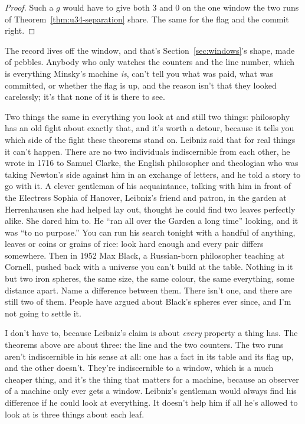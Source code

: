\documentclass[11pt,twoside]{article}
\theoremstyle{thielethm}
\theoremstyle{thieledef}
\theoremstyle{thieledef}
\theoremstyle{thieledef}
\theoremstyle{thielethm}
\theoremstyle{thieleobs}
\theoremstyle{thielethm}
\begin{document}
\begin{proof}
Such a $g$ would have to give both 3 and 0 on the one window the two runs of
Theorem~\ref{thm:u34-separation} share. The same for the flag and the commit right.
\end{proof}

The record lives off the window, and that's Section~\ref{sec:windows}'s shape, made of pebbles. Anybody who only
watches the counters and the line number, which is everything Minsky's machine \emph{is}, can't
tell you what was paid, what was committed, or whether the flag is up, and the reason isn't that
they looked carelessly; it's that none of it is there to see.

Two things the same in everything you look at and still two things: philosophy has an old fight
about exactly that, and it's worth a detour, because it tells you which side of the fight these
theorems stand on. Leibniz said that for real things it can't happen. There are no two
individuals indiscernible from each other, he wrote in 1716 to Samuel Clarke, the English
philosopher and theologian who was taking Newton's side against him in an exchange of letters,
and he told a story to go with it. A clever gentleman of his acquaintance, talking with him in
front of the Electress Sophia of Hanover, Leibniz's friend and patron, in the garden at
Herrenhausen she had helped lay out, thought he could find two leaves perfectly alike. She dared
him to. He ``ran all over the Garden a long time'' looking, and it was ``to no purpose.'' You can
run his search tonight with a handful of anything, leaves or coins or grains of rice: look hard
enough and every pair differs somewhere. Then in 1952 Max Black, a Russian-born philosopher
teaching at Cornell, pushed back with a universe you
can't build at the table. Nothing in it but two iron spheres, the same size, the same colour, the
same everything, some distance apart. Name a difference between them. There isn't one, and there
are still two of them. People have argued about Black's spheres ever since, and I'm not going to
settle it.

I don't have to, because Leibniz's claim is about \emph{every} property a thing has. The
theorems above are about three: the line and the two counters. The two runs aren't indiscernible
in his sense at all: one has a fact in its table and its flag up, and the other doesn't. They're indiscernible to a window, which is a much cheaper thing, and
it's the thing that matters for a machine, because an observer of a machine only ever gets a
window. Leibniz's gentleman would always find his difference if he could look at everything. It
doesn't help him if all he's allowed to look at is three things about each leaf.
\end{document}
